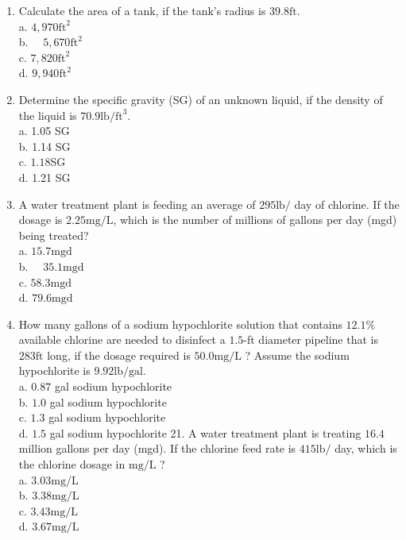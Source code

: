 \documentclass[10pt]{article}
\begin{document}
\begin{enumerate}
  \item Calculate the area of a tank, if the tank's radius is $39.8 \mathrm{ft}$.\\
a. $4,970 \mathrm{ft}^{2}$\\
b. $\quad 5,670 \mathrm{ft}^{2}$\\
c. $7,820 \mathrm{ft}^{2}$\\
d. $9,940 \mathrm{ft}^{2}$

  \item Determine the specific gravity (SG) of an unknown liquid, if the density of the liquid is $70.9 \mathrm{lb} / \mathrm{ft}^{3}$.\\
a. 1.05 SG\\
b. 1.14 SG\\
c. $1.18 \mathrm{SG}$\\
d. 1.21 SG

  \item A water treatment plant is feeding an average of $295 \mathrm{lb} /$ day of chlorine. If the dosage is $2.25 \mathrm{mg} / \mathrm{L}$, which is the number of millions of gallons per day (mgd) being treated?\\
a. $15.7 \mathrm{mgd}$\\
b. $\quad 35.1 \mathrm{mgd}$\\
c. $58.3 \mathrm{mgd}$\\
d. $79.6 \mathrm{mgd}$

  \item How many gallons of a sodium hypochlorite solution that contains $12.1 \%$ available chlorine are needed to disinfect a $1.5$-ft diameter pipeline that is $283 \mathrm{ft}$ long, if the dosage required is $50.0 \mathrm{mg} / \mathrm{L}$ ? Assume the sodium hypochlorite is $9.92 \mathrm{lb} / \mathrm{gal}$.\\
a. $0.87$ gal sodium hypochlorite\\
b. $1.0$ gal sodium hypochlorite\\
c. $1.3$ gal sodium hypochlorite\\
d. $1.5$ gal sodium hypochlorite 21. A water treatment plant is treating $16.4$ million gallons per day (mgd). If the chlorine feed rate is $415 \mathrm{lb} /$ day, which is the chlorine dosage in $\mathrm{mg} / \mathrm{L}$ ?\\
a. $3.03 \mathrm{mg} / \mathrm{L}$\\
b. $3.38 \mathrm{mg} / \mathrm{L}$\\
c. $3.43 \mathrm{mg} / \mathrm{L}$\\
d. $3.67 \mathrm{mg} / \mathrm{L}$


\end{enumerate}
\end{document}
